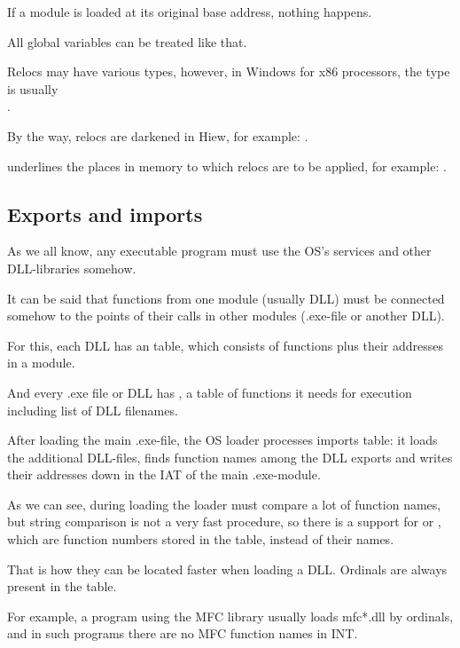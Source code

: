 If a module is loaded at its original base address, nothing happens.

All global variables can be treated like that.

Relocs may have various types, however, in Windows for x86 processors, the type is usually \\
.


By the way, relocs are darkened in Hiew, for example: .

\myindex{\olly}
\olly underlines the places in memory to which relocs are to be applied, for example: .

\subsection{Exports and imports}

\label{PE_exports_imports}
As we all know, any executable program must use the \ac{OS}'s services and other DLL-libraries somehow.

It can be said that functions from one module (usually DLL) must be connected somehow to the points of their
calls in other modules (.exe-file or another DLL).

For this, each DLL has an  table, which consists of functions plus their addresses in a module.

And every .exe file or DLL has , a table of functions it needs for execution including
list of DLL filenames.

After loading the main .exe-file, the \ac{OS} loader processes imports table: 
it loads the additional DLL-files, finds function names
among the DLL exports and writes their addresses down in the \ac{IAT} of the main .exe-module.


As we can see, during loading the loader must compare a lot of function names, but string comparison is not a very
fast procedure, so there is a support for  or ,
which are function numbers stored in the table, instead of their names.

That is how they can be located faster when loading a DLL.
Ordinals are always present in the  table.

For example, a program using the \ac{MFC} library usually loads mfc*.dll by ordinals,
and in such programs there are no \ac{MFC} function names in \ac{INT}.

